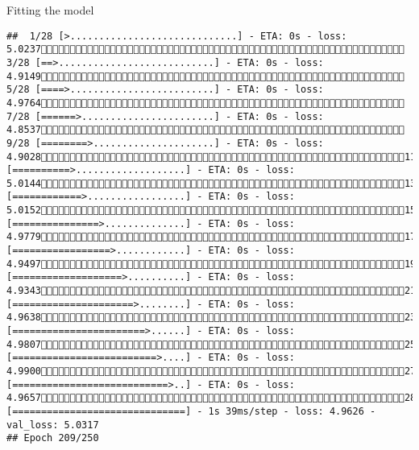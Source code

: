 \documentclass[
  ignorenonframetext,
]{beamer}
\begin{document}
\begin{frame}[fragile]{Fitting the model}
\begin{verbatim}
##  1/28 [>.............................] - ETA: 0s - loss: 5.0237 3/28 [==>...........................] - ETA: 0s - loss: 4.9149 5/28 [====>.........................] - ETA: 0s - loss: 4.9764 7/28 [======>.......................] - ETA: 0s - loss: 4.8537 9/28 [========>.....................] - ETA: 0s - loss: 4.902811/28 [==========>...................] - ETA: 0s - loss: 5.014413/28 [============>.................] - ETA: 0s - loss: 5.015215/28 [===============>..............] - ETA: 0s - loss: 4.977917/28 [=================>............] - ETA: 0s - loss: 4.949719/28 [===================>..........] - ETA: 0s - loss: 4.934321/28 [=====================>........] - ETA: 0s - loss: 4.963823/28 [=======================>......] - ETA: 0s - loss: 4.980725/28 [=========================>....] - ETA: 0s - loss: 4.990027/28 [===========================>..] - ETA: 0s - loss: 4.965728/28 [==============================] - 1s 39ms/step - loss: 4.9626 - val_loss: 5.0317
## Epoch 209/250

\end{verbatim}
\end{frame}
\end{document}
